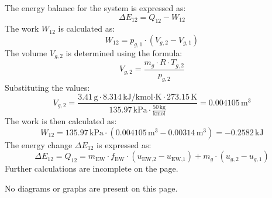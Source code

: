 The energy balance for the system is expressed as:  
\[
\Delta E_{12} = Q_{12} - W_{12}
\]  
The work \( W_{12} \) is calculated as:  
\[
W_{12} = p_{g,1} \cdot \left(V_{g,2} - V_{g,1}\right)
\]  
The volume \( V_{g,2} \) is determined using the formula:  
\[
V_{g,2} = \frac{m_g \cdot R \cdot T_{g,2}}{p_{g,2}}
\]  
Substituting the values:  
\[
V_{g,2} = \frac{3.41 \, \text{g} \cdot 8.314 \, \text{kJ}/\text{kmol·K} \cdot 273.15 \, \text{K}}{135.97 \, \text{kPa} \cdot \frac{50 \, \text{kg}}{\text{kmol}}} = 0.004105 \, \text{m}^3
\]  
The work is then calculated as:  
\[
W_{12} = 135.97 \, \text{kPa} \cdot \left(0.004105 \, \text{m}^3 - 0.00314 \, \text{m}^3\right) = -0.2582 \, \text{kJ}
\]  
The energy change \( \Delta E_{12} \) is expressed as:  
\[
\Delta E_{12} = Q_{12} = m_{\text{EW}} \cdot f_{\text{EW}} \cdot \left(u_{\text{EW,2}} - u_{\text{EW,1}}\right) + m_g \cdot \left(u_{g,2} - u_{g,1}\right)
\]  
Further calculations are incomplete on the page.  

No diagrams or graphs are present on this page.